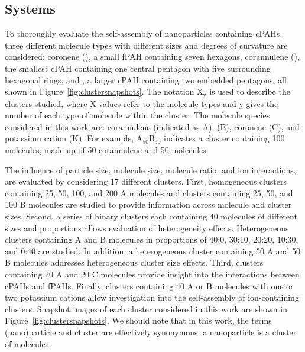 \subsection{Systems} %
To thoroughly evaluate the self-assembly of nanoparticles containing cPAHs, three different molecule types with different sizes and degrees of curvature are considered: coronene (), a small fPAH containing seven hexagons, corannulene (), the smallest cPAH containing one central pentagon with five surrounding hexagonal rings, and , a larger cPAH containing two embedded pentagons, all shown in Figure~\ref{fig:clustersnapshots}. The notation $\text{X}_{\text{y}}$ is used to describe the clusters studied, where X values refer to the molecule types and y gives the number of each type of molecule within the cluster. The molecule species considered in this work are: corannulene (indicated as A),  (B), coronene (C), and potassium cation (K). For example, $\text{A}_{\text{50}}\text{B}_{\text{50}}$ indicates a cluster containing 100 molecules, made up of 50 corannulene and 50  molecules.

The influence of particle size, molecule size, molecule ratio, and ion interactions, are evaluated by considering 17 different clusters. First, homogeneous clusters containing 25, 50, 100, and 200 A molecules and clusters containing 25, 50, and 100 B molecules are studied to provide information across molecule and cluster sizes. 
Second, a series of binary clusters each containing 40 molecules of different sizes and proportions allows evaluation of heterogeneity effects. Heterogeneous clusters containing A and B molecules in proportions of 40:0, 30:10, 20:20, 10:30, and 0:40 are studied. In addition, a heterogeneous cluster containing 50 A and 50 B molecules addresses heterogeneous cluster size effects.
Third, clusters containing 20 A and 20 C molecules provide insight into the interactions between cPAHs and fPAHs.
Finally, clusters containing 40 A or B molecules with one or two potassium cations allow investigation into the self-assembly of ion-containing clusters.
Snapshot images of each cluster considered in this work are shown in Figure~\ref{fig:clustersnapshots}. We should note that in this work, the terms (nano)particle and cluster are effectively synonymous: a nanoparticle is a cluster of molecules.

